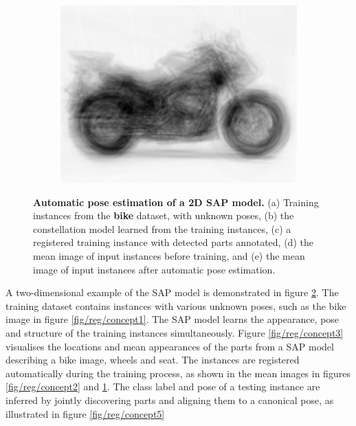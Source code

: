 \begin{figure}[ht]
\begin{subfigure}[b]{0.35\linewidth}
	\includegraphics[width=\linewidth]{fig/reg/avgbike_after.png}
	\label{fig/reg/concept4}
\end{subfigure} 
\caption{\textbf{Automatic pose estimation of a 2D SAP model.} (a) Training instances from the \textbf{bike} dataset, with unknown poses, (b) the constellation model learned from the training instances, (c) a registered training instance with detected parts annotated, (d) the mean image of input instances before training, and (e) the mean image of input instances after automatic pose estimation.}
\label{fig/reg/concept}
\end{figure}

A two-dimensional example of the SAP model is demonstrated in figure \ref{fig/reg/concept}. The training dataset contains instances with various unknown poses, such as the bike image in figure \ref{fig/reg/concept1}. The SAP model learns the appearance, pose and structure of the training instances simultaneously. 
Figure \ref{fig/reg/concept3} visualises the locations and mean appearances of the parts from a SAP model describing a bike image, \eg wheels and seat. The instances are registered automatically during the training process, as shown in the mean images in figures \ref{fig/reg/concept2} and \ref{fig/reg/concept4}. The class label and pose of a testing instance are inferred by jointly discovering parts and aligning them to a canonical pose, as illustrated in figure \ref{fig/reg/concept5}

